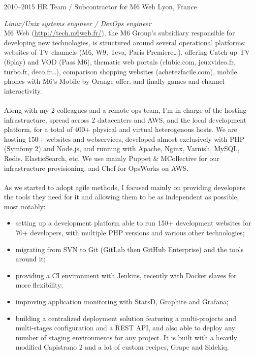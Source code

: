 \documentclass[]{friggeri-cv} %
\begin{document}
\begin{entrylist}
\entry
{2010--2015}
{HR Team / Subcontractor for M6 Web}
{Lyon, France}
{\emph{Linux/Unix systems engineer / DevOps engineer} \\
M6 Web (\url{http://tech.m6web.fr/}), the M6 Group’s subsidiary responsible for
    developing new technologies, is structured around several operational
    platforms: websites of TV channels (M6, W9, Teva, Paris Premiere\dots),
    offering Catch-up TV (6play) and VOD (Pass M6), thematic web portals
    (clubic.com, jeuxvideo.fr, turbo.fr, deco.fr\dots), comparison shopping
    websites (achetezfacile.com), mobile phones with M6’s Mobile by Orange
    offer, and finally games and channel interactivity. \\
\\
Along with my 2 colleagues and a remote ops team, I'm in charge of the hosting
    infrastructure, spread across 2 datacenters and AWS, and the local
    development platform, for a total of 400+ physical and virtual heterogenous
    hosts. We are hosting 150+ websites and webservices, developed almost
    exclusively with PHP (Symfony 2) and Node.js, and running with Apache,
    Nginx, Varnish, MySQL, Redis, ElasticSearch, etc. We use mainly Puppet \&
    MCollective for our infrastructure provisioning, and Chef for OpsWorks on
    AWS. \\
\\
As we started to adopt agile methods, I focused mainly on providing developers
    the tools they need for it and allowing them to be as independent as
    possible, most notably:
\begin{itemize}
  \item setting up a development platform able to run 150+ development websites
      for 70+ developers, with multiple PHP versions and various other
      technologies;
  \item migrating from SVN to Git (GitLab then GitHub Enterprise) and the tools
      around it;
  \item providing a CI environment with Jenkins, recently with Docker slaves
      for more flexibility;
  \item improving application monitoring with StatsD, Graphite and Grafana;
  \item building a centralized deployment solution featuring a multi-projects
      and multi-stages configuration and a REST API, and also able to deploy
      any number of staging environments for any project. It is built with a
      heavily modified Capistrano 2 and a lot of custom recipes, Grape and
      Sidekiq.
\end{itemize}}


\end{entrylist}
\end{document}
